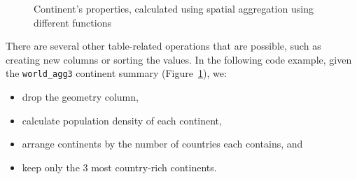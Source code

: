 \documentclass[
  letterpaper,
]{krantz}
\providecommand{\tightlist}{%
  \setlength{\itemsep}{0pt}\setlength{\parskip}{0pt}}\usepackage{longtable,booktabs,array}
\begin{document}
\begin{figure}

\begin{minipage}{0.33\linewidth}



\end{minipage}%
%
\begin{minipage}{0.33\linewidth}



\end{minipage}%
%
\begin{minipage}{0.33\linewidth}



\end{minipage}%

\caption{\label{fig-spatial-aggregation-different-functions}Continent's
properties, calculated using spatial aggregation using different
functions}

\end{figure}%

There are several other table-related operations that are possible, such
as creating new columns or sorting the values. In the following code
example, given the \texttt{world\_agg3} continent summary
(Figure~\ref{fig-spatial-aggregation-different-functions}), we:

\begin{itemize}
\tightlist
\item
  drop the geometry column,
\item
  calculate population density of each continent,
\item
  arrange continents by the number of countries each contains, and
\item
  keep only the 3 most country-rich continents.
\end{itemize}
\end{document}
